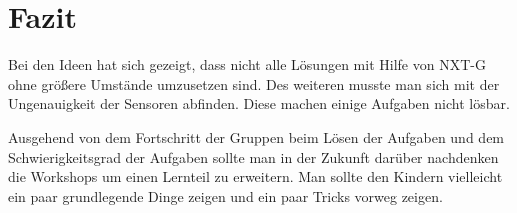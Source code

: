 \chapter{Fazit}
Bei den Ideen hat sich gezeigt, dass nicht alle Lösungen mit Hilfe von NXT-G ohne größere Umstände umzusetzen sind. Des weiteren musste man sich mit der Ungenauigkeit der Sensoren abfinden. Diese machen einige Aufgaben nicht lösbar.

Ausgehend von dem Fortschritt der Gruppen beim Lösen der Aufgaben und dem Schwierigkeitsgrad der Aufgaben sollte man in der Zukunft darüber nachdenken die Workshops um einen Lernteil zu erweitern. Man sollte den Kindern vielleicht ein paar grundlegende Dinge zeigen und ein paar Tricks vorweg zeigen. 